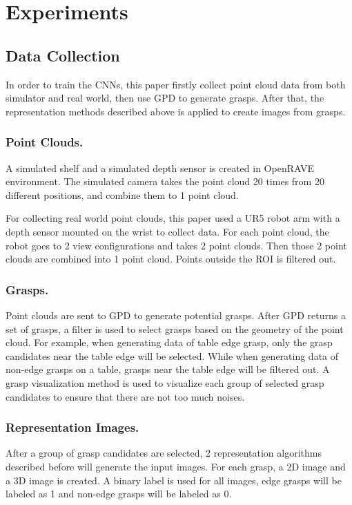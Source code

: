 \documentclass[letterpaper]{article} %
\begin{document}
\section{Experiments}
\subsection{Data Collection}
In order to train the CNNs, this paper firstly collect point cloud data from both simulator and real world, then use GPD \cite{RN6} to generate grasps. After that, the representation methods described above is applied to create images from grasps.

\subsubsection{Point Clouds.} A simulated shelf and a simulated depth sensor is created in OpenRAVE environment. The simulated camera takes the point cloud 20 times from 20 different positions, and combine them to 1 point cloud. 

For collecting real world point clouds, this paper used a UR5 robot arm with a depth sensor mounted on the wrist to collect data. For each point cloud, the robot goes to 2 view configurations and takes 2 point clouds. Then those 2 point clouds are combined into 1 point cloud. Points outside the ROI is filtered out. 

\subsubsection{Grasps.} Point clouds are sent to GPD \cite{RN6} to generate potential grasps. After GPD returns a set of grasps, a filter is used to select grasps based on the geometry of the point cloud. For example, when generating data of table edge grasp, only the grasp candidates near the table edge will be selected. While when generating data of non-edge grasps on a table, grasps near the table edge will be filtered out. A grasp visualization method is used to visualize each group of selected grasp candidates to ensure that there are not too much noises. 

\subsubsection{Representation Images.} After a group of grasp candidates are selected, 2 representation algorithms described before will generate the input images. For each grasp, a 2D image and a 3D image is created. A binary label is used for all images, edge grasps will be labeled as 1 and non-edge grasps will be labeled as 0.
\end{document}
